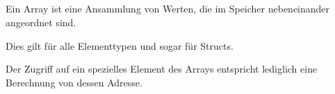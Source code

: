 \subsection{\Conclusion{}}

Ein Array ist eine Ansammlung von Werten, die im Speicher nebeneinander angeordnet sind.

Dies gilt für alle Elementtypen und sogar für Structs.

Der Zugriff auf ein spezielles Element des Arrays entspricht lediglich eine Berechnung von dessen Adresse.